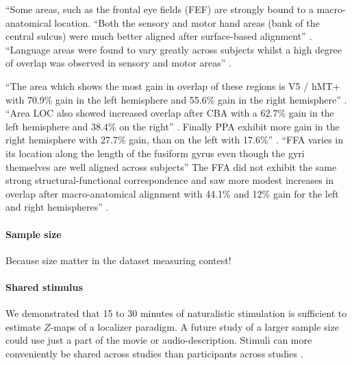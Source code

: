 %
``Some areas, such as the frontal eye fields (FEF) are strongly bound to a
macro-anatomical location.
%
``Both the sensory and motor hand areas (bank of the central sulcus) were much
better aligned after surface-based alignment'' \citep{frost2012measuring}.
%
``Language areas were found to vary greatly across subjects whilst a high degree
of overlap was observed in sensory and motor areas'' \citep{frost2012measuring}.

%
``The area which shows the most gain in overlap of these regions is V5 / hMT+
with 70.9\% gain in the left hemisphere and 55.6\% gain in the right
hemisphere'' \citep{frost2012measuring}.
%
``Area LOC also showed increased overlap after CBA with a 62.7\% gain in the
left hemisphere and 38.4\% on the right'' \citep{frost2012measuring}.
%
Finally PPA exhibit more gain in the right hemisphere with 27.7\% gain, than on
the left with 17.6\%'' \citep{frost2012measuring}.
%
``FFA varies in its location along the length of the fusiform gyrus even though
the gyri themselves are well aligned across subjects''
%
The FFA did not exhibit the same strong structural-functional correspondence and
saw more modest increases in overlap after macro-anatomical alignment with
44.1\% and 12\% gain for the left and right hemispheres''
\citep{frost2012measuring}.


\paragraph{Sample size}



Because size matter in the dataset measuring contest!



\paragraph{Shared stimulus}

%
We demonstrated that 15 to 30 minutes of naturalistic stimulation is sufficient
to estimate $Z$-maps of a localizer paradigm.
%
A future study of a larger sample size could use just a part of the movie or
audio-description.
%
Stimuli can more conveniently be shared across studies than participants across
studies \citep[cf.][an extension of the \ac{srm} for shared subjects across
datasets]{zhang2018transfer}.







